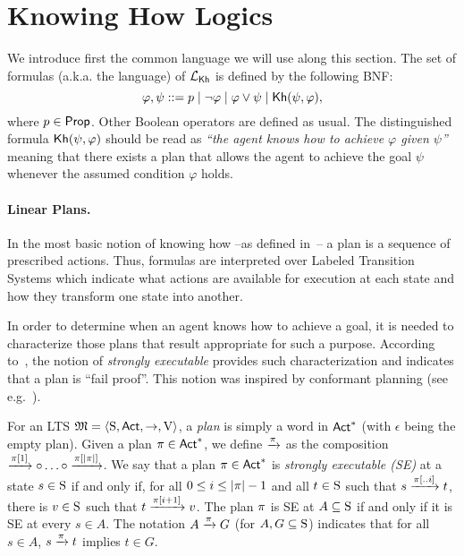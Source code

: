\section{Knowing How Logics}
\label{sec:khlinearplans}

We introduce first the common language we will use along this section. 
The set of formulas (a.k.a. the language) of $\Khlogic$ is defined by the following BNF:
%
\[
  \varphi, \psi ::= p \mid \neg \varphi \mid \varphi \vee \psi \mid \kh(\psi,\varphi),
\]
%
where $p\in\Prop$. Other Boolean operators are defined as usual.
%
The distinguished formula $\kh(\psi,\varphi)$ should be read as \emph{``the agent knows how to achieve $\varphi$ given $\psi$''} meaning that there exists a plan that allows the agent to achieve the goal $\psi$ whenever the assumed condition $\varphi$ holds.

\paragraph{Linear Plans.} 
In the most basic notion of knowing how --as defined in~\cite{Wang15lori,Wang16,Wang2016}-- a plan is a sequence of prescribed actions.
%
Thus, formulas are interpreted over Labeled Transition Systems which indicate what actions are available for execution at each state and how they transform one state into another.

In order to determine when an agent knows how to achieve a goal, it is needed to characterize those %
plans that result appropriate for such a purpose.  According to~\cite{Wang15lori}, the notion of \emph{strongly executable} provides such characterization and indicates that a plan is ``fail proof''. This notion was inspired by conformant planning (see e.g.~\cite{CimattiRT98}).

For an LTS $\model=\tup{\S,\Act,\ra,\V}$, a \emph{plan} is simply a word in $\Act^*$ (with $\epsilon$ being the empty plan).  
%
Given a plan $\plan\in\Act^*$, we define $\reach{\plan}$ as the composition $\reach{\plan[1]} \comp \ldots \comp \reach{\plan[\size{\plan}]}$. 
%
We say that a plan $\plan\in\Act^*$ is \emph{strongly executable (SE)} at a state $s\in\S$ if and only if, for all $0\leq i \leq \size{\plan}-1$ and all $t\in\S$ such that $s\reach{\plan[..i]} t$, there is $v\in\S$ such that $t\reach{\plan[i+1]} v$. The plan $\plan$ is SE at $A\subseteq \S$ if and only if it is SE at every $s\in A$. The notation $A \reach{\plan} G$ (for $A,G\subseteq\S$) indicates that for all $s\in A$,  $s\reach{\plan} t$ implies $t\in G$.

